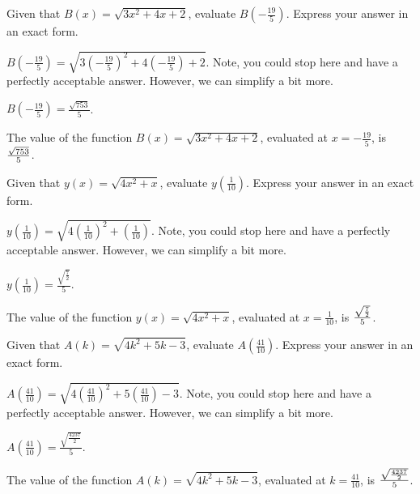 \begin{shuffle}
\begin{exercise}
Given that $B(x)=\sqrt{3 x^2+4 x+2}$, evaluate $B\left(-\frac{19}{5}\right)$. Express your answer in an exact form.
\begin{solution}
\begin{hint}
$B\left(-\frac{19}{5}\right)=\sqrt{3 (-\frac{19}{5})^2+4 (-\frac{19}{5})+2}$. Note, you could stop here and have a perfectly acceptable answer. However, we can simplify a bit more. 
\end{hint}
\begin{hint}
$B\left(-\frac{19}{5}\right)=\frac{\sqrt{753}}{5}$.
\end{hint}
The value of the function $B(x)=\sqrt{3 x^2+4 x+2}$, evaluated at $x=-\frac{19}{5}$, is ${\frac{\sqrt{753}}{5}}$.
\end{solution}
\end{exercise}

\begin{exercise}
Given that $y(x)=\sqrt{4 x^2+x}$, evaluate $y\left(\frac{1}{10}\right)$. Express your answer in an exact form.
\begin{solution}
\begin{hint}
$y\left(\frac{1}{10}\right)=\sqrt{4 (\frac{1}{10})^2+(\frac{1}{10})}$. Note, you could stop here and have a perfectly acceptable answer. However, we can simplify a bit more. 
\end{hint}
\begin{hint}
$y\left(\frac{1}{10}\right)=\frac{\sqrt{\frac{7}{2}}}{5}$.
\end{hint}
The value of the function $y(x)=\sqrt{4 x^2+x}$, evaluated at $x=\frac{1}{10}$, is ${\frac{\sqrt{\frac{7}{2}}}{5}}$.
\end{solution}
\end{exercise}

\begin{exercise}
Given that $A(k)=\sqrt{4 k^2+5 k-3}$, evaluate $A\left(\frac{41}{10}\right)$. Express your answer in an exact form.
\begin{solution}
\begin{hint}
$A\left(\frac{41}{10}\right)=\sqrt{4 (\frac{41}{10})^2+5 (\frac{41}{10})-3}$. Note, you could stop here and have a perfectly acceptable answer. However, we can simplify a bit more. 
\end{hint}
\begin{hint}
$A\left(\frac{41}{10}\right)=\frac{\sqrt{\frac{4237}{2}}}{5}$.
\end{hint}
The value of the function $A(k)=\sqrt{4 k^2+5 k-3}$, evaluated at $k=\frac{41}{10}$, is ${\frac{\sqrt{\frac{4237}{2}}}{5}}$.
\end{solution}
\end{exercise}


\end{shuffle}
